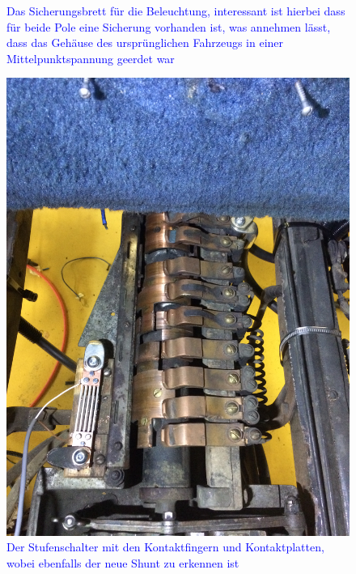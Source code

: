 \begin{landscape}
\begin{figure}[h]
	\caption{\textcolor{blue}{Das Sicherungsbrett für die Beleuchtung, interessant ist hierbei dass für beide Pole eine Sicherung vorhanden ist, was annehmen lässt, dass das Gehäuse des ursprünglichen Fahrzeugs in einer Mittelpunktspannung geerdet war}}
	\label{fig:Sicherungsbrett_Beleuchtung}
\end{figure}
\begin{figure}[h]
	\centering
		\includegraphics[width=1.30\textwidth]{images/Anhang/Stufenschalter.jpg}
	\caption{\textcolor{blue}{Der Stufenschalter mit den Kontaktfingern und Kontaktplatten, wobei ebenfalls der neue Shunt zu erkennen ist}}
	\label{fig:Stufenschalter_Anhang}
\end{figure}\end{landscape}

